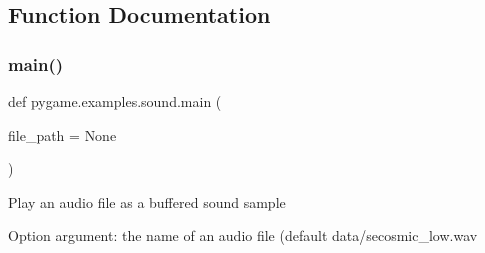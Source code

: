 \subsection{Function Documentation}
\mbox{\label{namespacepygame_1_1examples_1_1sound_a7cacd703564f154f8c2bed91901ed695}} 
\subsubsection{\texorpdfstring{main()}{main()}}
{\footnotesize\ttfamily def pygame.\+examples.\+sound.\+main (\begin{DoxyParamCaption}\item[{}]{file\+\_\+path = {\ttfamily None} }\end{DoxyParamCaption})}

\begin{DoxyVerb}Play an audio file as a buffered sound sample

Option argument:
    the name of an audio file (default data/secosmic_low.wav\end{DoxyVerb}
 
